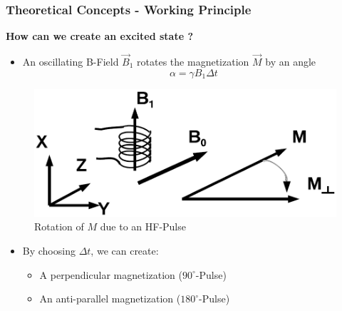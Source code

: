\documentclass[aspectratio=169]{beamer}
\begin{document}
\begin{frame}
\frametitle{Theoretical Concepts - Working Principle}
\begin{minipage}[t]{0.65\textwidth}
	\textbf{How can we create an excited state ?}
	\begin{itemize}
		\item An oscillating B-Field $\vec{B}_1$ rotates the magnetization $\vec{M}$ by an angle
		\begin{equation}
		\alpha = \gamma B_1 \Delta t
		\end{equation}
	\end{itemize}
\end{minipage}
\hspace*{10pt}
\begin{minipage}[t]{0.3\textwidth}
	\begin{figure}[H]
		\centering
		\includegraphics[width=\textwidth]{./Resources/hf_pulse.png}
		\caption{Rotation of $M$ due to an HF-Pulse}
	\end{figure}
\end{minipage}

\begin{itemize}
	\pause
	\item By choosing $\Delta t$, we can create:
	\begin{itemize}
		\item A perpendicular magnetization ($90^\circ$-Pulse)
		\item An anti-parallel magnetization ($180^\circ$-Pulse)
	\end{itemize}
\end{itemize}
\end{frame}
\end{document}
